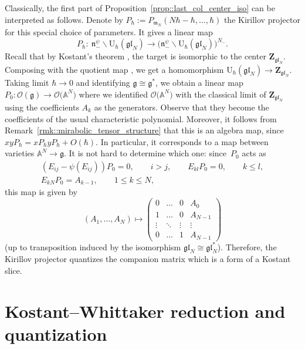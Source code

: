 \documentclass[10pt,a4paper]{article}
\numberwithin{equation}{section}
\newcommand{\cO}{\mathcal{O}}
\newcommand{\U}{\mathrm{U}_{\hbar}}
\newcommand{\Z}{\mathbf{Z}}
\newcommand{\g}{\mathfrak{g}}
\newcommand{\n}{\mathfrak{n}}
\newcommand{\m}{\mathfrak{m}}
\newcommand{\gl}{\mathfrak{gl}}
\begin{document}
	\begin{Remark}
		\label{rmk::special_param}
		Classically, the first part of Proposition~\ref{prop::last_col_center_iso} can be interpreted as follows. Denote by
		$
		P_{\hbar} := P_{\m_N}(N\hbar-\hbar,\dots,\hbar)
		$
		the Kirillov projector for this special choice of parameters. It gives a linear map
		\[
		P_{\hbar} \colon\ \n_-^{\psi} \backslash \U(\gl_N) \rightarrow \bigl(\n_-^{\psi} \backslash \U(\gl_N)\bigr)^{N_-}.
		\]
		Recall that by Kostant's theorem \cite{Kostant}, the target is isomorphic to the center $\Z_{\gl_N}$. Composing with the quotient map \smash{$\U(\gl_N) \rightarrow \n_-^{\psi} \backslash \U(\gl_N)$}, we get a homomorphism
		$
		\U(\gl_N) \rightarrow \Z_{\gl_N}$.
		Taking limit $\hbar \rightarrow 0$ and identifying $\g \cong \g^*$, we obtain a linear map
$
		P_0\colon \cO(\g) \rightarrow \cO\bigl(\mathbb{A}^N\bigr)$
		where we identified $\cO\bigl(\mathbb{A}^N\bigr)$ with the classical limit of $\Z_{\gl_N}$ using the coefficients $A_k$ as the generators. Observe that they become the coefficients of the usual characteristic polynomial. Moreover, it follows from Remark~\ref{rmk::mirabolic_tensor_structure} that this is an algebra map, since
$
		xy P_{\hbar}= x P_{\hbar} y P_{\hbar} + O(\hbar)$.
		In particular, it corresponds to a map between varieties $\mathbb{A}^N \rightarrow \g$. It is not hard to determine which one: since~$P_0$ acts as
		\begin{gather*}
			(E_{ij} - \psi(E_{ij})) P_{0} =0,\qquad i>j, \qquad
			E_{kl} P_0 = 0,\qquad k \leq l, \\
			E_{kN} P_0 = A_{k-1},\qquad 1 \leq k \leq N,
		\end{gather*}
		this map is given by
		\[
		(A_1,\dots,A_N) \mapsto
		\begin{pmatrix}
			0 & \dots & 0 & A_0 \\
			1 & \dots & 0 & A_{N-1} \\
			\vdots & \ddots & \vdots & \vdots \\
			0 & \dots & 1 & A_{N-1}
		\end{pmatrix}
		\]
		(up to transposition induced by the isomorphism $\gl_N \cong \gl_N^*$). Therefore, the Kirillov projector quantizes the companion matrix which is a form of a Kostant slice.
	\end{Remark}
	
	\section{Kostant--Whittaker reduction and quantization}
	\label{sect::kw_red}
	
\end{document}
